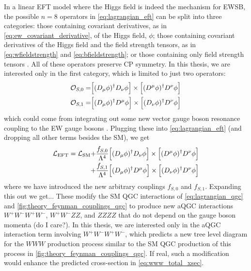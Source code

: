 
In a linear EFT model where the Higgs field is indeed the mechanism for EWSB, 
the possible $n=8$ operators 
in \eqn\eqref{eq:lagrangian_eft} can
be split into three categories: those containing covariant derivatives,
as in \eqn\eqref{eq:ew_covariant_derivative}, of the Higgs field, $\phi$; 
those containing covariant derivatives of the Higgs field and 
the field strength tensors, as 
in \eqn\eqref{eq:wfieldstrength} and \eqref{eq:bfieldstrength};
or those containing only field strength tensors \cite{Eboli:2006wa,Eboli:2003nq}. 
All of these operators preserve CP symmetry.
In this thesis, we are
interested only in the first category, which is limited to just two operators:
\begin{align}
\mathcal{O}_{S,0} =& \Big[(D_{\mu}\phi)^{\dagger} D_{\nu} \phi\Big] \times \Big[(D^{\mu} \phi)^{\dagger} D^{\nu} \phi \Big] \\
\mathcal{O}_{S,1} =& \Big[(D_{\mu}\phi)^{\dagger} D^{\mu} \phi\Big] \times \Big[(D_{\nu} \phi)^{\dagger} D^{\nu} \phi \Big]
\end{align}
which could come from integrating out some new 
vector gauge boson resonance coupling to the EW gauge bosons \cite{Baak:2013fwa}.
Plugging these into \eqn\eqref{eq:lagrangian_eft} (and dropping all other terms
besides the SM), we get
\begin{equation}
\begin{aligned}
\mathcal{L}_{\textrm{EFT}} = \mathcal{L}_{\textrm{SM}} +&
\frac{f_{S,0}}{\Lambda^4}\Big[(D_{\mu}\phi)^{\dagger} D_{\nu} \phi\Big] \times \Big[(D^{\mu} \phi)^{\dagger} D^{\nu} \phi \Big] \\
+& \frac{f_{S,1}}{\Lambda^4}\Big[(D_{\mu}\phi)^{\dagger} D^{\mu} \phi\Big] \times \Big[(D_{\nu} \phi)^{\dagger} D^{\nu} \phi \Big]
\end{aligned}
\label{eq:lagrangian_aqgc}
\end{equation}
where we have introduced the new arbitrary couplings $f_{S,0}$ and $f_{S,1}$.
Expanding this out we get...
These modify the SM QGC interactions of \eqn\eqref{eq:lagrangian_qgc}
and \fig\ref{fig:theory_feynman_couplings_qgc}
to produce new aQGC interactions $W^+W^-W^+W^-$, $W^+W^-ZZ$, and $ZZZZ$
that do not depend on the gauge boson momenta (do I care?).
In this thesis, we are interested only in the aQGC
interaction term involving $W^+W^-W^+W^-$, which predicts  
a new tree level diagram for the $WWW$ production process similar to the SM QGC
production of this process in \fig\ref{fig:theory_feynman_couplings_qgc}.
If real, such a modification would enhance the predicted 
cross-section in \eqn\eqref{eq:www_total_xsec}.

